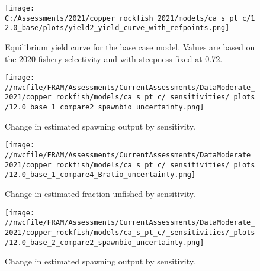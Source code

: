 \documentclass[11pt,
  english,
  a4paper,
]{article}
\begin{document}
\begin{figure}
\centering
\texttt{[image: C:/Assessments/2021/copper\_rockfish\_2021/models/ca\_s\_pt\_c/12.0\_base/plots/yield2\_yield\_curve\_with\_refpoints.png]}
\caption{Equilibrium yield curve for the base case model. Values are based on the 2020 fishery selectivity and with steepness fixed at 0.72.\label{fig:yield}}
\end{figure}

\tagmcend\tagstructend


\begin{figure}
\centering
\texttt{[image: //nwcfile/FRAM/Assessments/CurrentAssessments/DataModerate\_2021/copper\_rockfish/models/ca\_s\_pt\_c/\_sensitivities/\_plots/12.0\_base\_1\_compare2\_spawnbio\_uncertainty.png]}
\caption{Change in estimated spawning output by sensitivity.\label{fig:sens-ssb-1}}
\end{figure}

\tagmcend\tagstructend


\begin{figure}
\centering
\texttt{[image: //nwcfile/FRAM/Assessments/CurrentAssessments/DataModerate\_2021/copper\_rockfish/models/ca\_s\_pt\_c/\_sensitivities/\_plots/12.0\_base\_1\_compare4\_Bratio\_uncertainty.png]}
\caption{Change in estimated fraction unfished by sensitivity.\label{fig:sens-depl-1}}
\end{figure}

\tagmcend\tagstructend


\begin{figure}
\centering
\texttt{[image: //nwcfile/FRAM/Assessments/CurrentAssessments/DataModerate\_2021/copper\_rockfish/models/ca\_s\_pt\_c/\_sensitivities/\_plots/12.0\_base\_2\_compare2\_spawnbio\_uncertainty.png]}
\caption{Change in estimated spawning output by sensitivity.\label{fig:sens-ssb-2}}
\end{figure}

\tagmcend\tagstructend
\end{document}
